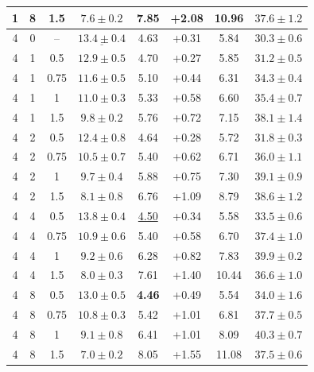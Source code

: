 \documentclass{article}
\begin{document}
\begin{table}[!htbp]
\begin{tabular}{cccccccc}
1 & 8 & 1.5 & $7.6\pm0.2$ & 7.85 & +2.08 & 10.96 & $37.6\pm1.2$\\
\midrule
4 & 0 & -- & $\underline{13.4\pm0.4}$& 4.63 & +0.31 & 5.84 & $30.3\pm0.6$\\
4 & 1 & 0.5 & $12.9\pm0.5$ & 4.70 & +0.27 & 5.85 & $31.2\pm0.5$\\
4 & 1 & 0.75 & $11.6\pm0.5$ & 5.10 & +0.44 & 6.31 & $34.3\pm0.4$\\
4 & 1 & 1 & $11.0\pm0.3$ & 5.33 & +0.58 & 6.60 & $35.4\pm0.7$\\
4 & 1 & 1.5 & $9.8\pm0.2$ & 5.76 & +0.72 & 7.15 & $38.1\pm1.4$\\
4 & 2 & 0.5 & $12.4\pm0.8$ & 4.64 & +0.28 & 5.72 & $31.8\pm0.3$\\
4 & 2 & 0.75 & $10.5\pm0.7$ & 5.40 & +0.62 & 6.71 & $36.0\pm1.1$\\
4 & 2 & 1 & $9.7\pm0.4$ & 5.88 & +0.75 & 7.30 & $39.1\pm0.9$\\
4 & 2 & 1.5 & $8.1\pm0.8$ & 6.76 & +1.09 & 8.79 & $38.6\pm1.2$\\
4 & 4 & 0.5 & $\mathbf{13.8\pm0.4}$& \underline{4.50}& +0.34 & 5.58 & $33.5\pm0.6$\\
4 & 4 & 0.75 & $10.9\pm0.6$ & 5.40 & +0.58 & 6.70 & $37.4\pm1.0$\\
4 & 4 & 1 & $9.2\pm0.6$ & 6.28 & +0.82 & 7.83 & $39.9\pm0.2$\\
4 & 4 & 1.5 & $8.0\pm0.3$ & 7.61 & +1.40 & 10.44 & $36.6\pm1.0$\\
4 & 8 & 0.5 & $13.0\pm0.5$ & \textbf{4.46}& +0.49 & 5.54 & $34.0\pm1.6$\\
4 & 8 & 0.75 & $10.8\pm0.3$ & 5.42 & +1.01 & 6.81 & $37.7\pm0.5$\\
4 & 8 & 1 & $9.1\pm0.8$ & 6.41 & +1.01 & 8.09 & $40.3\pm0.7$\\
4 & 8 & 1.5 & $7.0\pm0.2$ & 8.05 & +1.55 & 11.08 & $37.5\pm0.6$\\
\bottomrule
\end{tabular}
\end{table}
\clearpage
\end{document}
